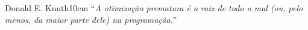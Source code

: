 \begin{epigrafe}{Donald E. Knuth}{10cm}
``\emph{A otimização prematura é a raiz de todo o mal (ou, pelo menos, da maior parte dele) na
programação.}''
\end{epigrafe}
